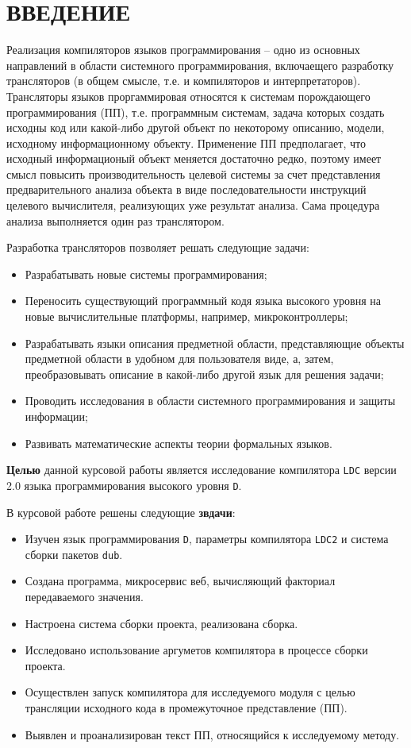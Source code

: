 \documentclass{studrep}
\begin{document}
\tableofcontents

\chapter*{ВВЕДЕНИЕ}
\label{chap:intro}

Реализация компиляторов языков программирования -- одно из основных направлений в области системного программирования, включаещего разработку трансляторов (в общем смысле, т.е. и компиляторов и интерпретаторов).  Трансляторы языков проргаммировая относятся к системам порождающего программирования (ПП), т.е. программным системам, задача которых создать исходны код или какой-либо другой объект по некоторому описанию, модели, исходному информационному объекту.  Применение ПП предполагает, что исходный информационый объект меняется достаточно редко, поэтому имеет смысл повысить производительность целевой системы за счет представления предварительного анализа объекта в виде последовательности инструкций целевого вычислителя, реализующих уже результат анализа.  Сама процедура анализа выполняется один раз транслятором.

Разработка трансляторов позволяет решать следующие задачи:
\begin{itemize}
\item Разрабатывать новые системы программирования;
\item Переносить существующий программный кодя языка высокого уровня на новые вычислительные платформы, например, микроконтроллеры;
\item Разрабатывать языки описания предметной области, представляющие объекты предметной области в удобном для пользователя виде, а, затем, преобразовывать описание в какой-либо другой язык для решения задачи;
\item Проводить исследования в области системного программирования и защиты информации;
\item Развивать математические аспекты теории формальных языков.
\end{itemize}

\textbf{Целью} данной курсовой работы является исследование компилятора \verb|LDC| версии 2.0 языка программирования высокого уровня \verb|D|.

В курсовой работе решены следующие \textbf{звдачи}:
\begin{itemize}
\item Изучен язык программирования \verb|D|, параметры компилятора \verb|LDC2| и система сборки пакетов \verb|dub|.
\item Создана программа, микросервис веб, вычисляющий факториал передаваемого значения.
\item Настроена система сборки проекта, реализована сборка.
\item Исследовано использование аргуметов компилятора в процессе сборки проекта.
\item Осуществлен запуск компилятора для исследуемого модуля с целью трансляции исходного кода в промежуточное представление (ПП).
\item Выявлен и проанализирован текст ПП, относящийся к исследуемому методу.
\end{itemize}
\end{document}
